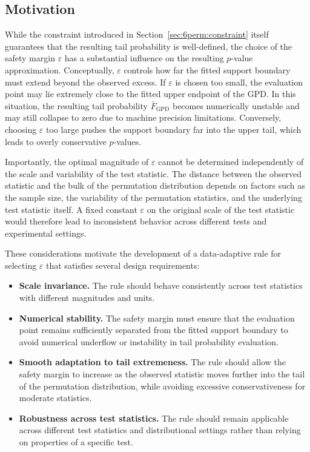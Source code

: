 \subsection{Motivation}
\label{sec:6perm:epsilon:motivation}

While the constraint introduced in Section~\ref{sec:6perm:constraint} itself guarantees that the resulting tail probability is well-defined, the choice of the safety margin $\varepsilon$ has a substantial influence on the resulting $p$-value approximation.
Conceptually, $\varepsilon$ controls how far the fitted support boundary must extend beyond the observed excess. 
If $\varepsilon$ is chosen too small, the evaluation point may lie extremely close to the fitted upper endpoint of the GPD. In this situation, the resulting tail probability $\bar F_{\mathrm{GPD}}$ becomes numerically unstable and may still collapse to zero due to machine precision limitations. Conversely, choosing $\varepsilon$ too large pushes the support boundary far into the upper tail, which leads to overly conservative $p$-values. 

Importantly, the optimal magnitude of $\varepsilon$ cannot be determined independently of the scale and variability of the test statistic. The distance between the observed statistic and the bulk of the permutation distribution depends on factors such as the sample size, the variability of the permutation statistics, and the underlying test statistic itself. A fixed constant $\varepsilon$ on the original scale of the test statistic would therefore lead to inconsistent behavior across different tests and experimental settings.

These considerations motivate the development of a data-adaptive rule for selecting $\varepsilon$ that satisfies several design requirements:

\begin{itemize}
  \item \textbf{Scale invariance.}  
  The rule should behave consistently across test statistics with different magnitudes and units.
  \item \textbf{Numerical stability.}  
  The safety margin must ensure that the evaluation point remains sufficiently separated from the fitted support boundary to avoid numerical underflow or instability in tail probability evaluation.
  \item \textbf{Smooth adaptation to tail extremeness.}  
  The rule should allow the safety margin to increase as the observed statistic moves further into the tail of the permutation distribution, while avoiding excessive conservativeness for moderate statistics.
  \item \textbf{Robustness across test statistics.}  
  The rule should remain applicable across different test statistics and distributional settings rather than relying on properties of a specific test.
\end{itemize}

